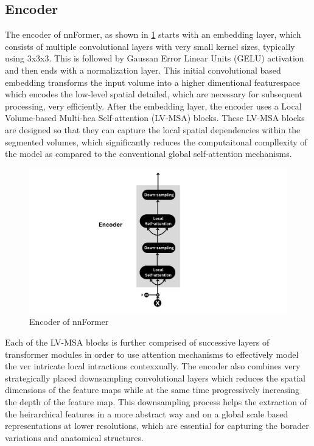 \subsection{Encoder}
The encoder of nnFormer, as shown in \cref{Fig:encoder} starts with an embedding layer, which consists of multiple convolutional layers with very small kernel sizes, typically using 3x3x3. This is followed by Gaussan Error Linear Units (GELU) activation and then ends with a normalization layer. This initial convolutional based embedding transforms the input volume into a higher dimentional featurespace which encodes the low-level spatial detailed, which are necessary for subsequent processing, very efficiently. After the embedding layer, the encoder uses a Local Volume-based Multi-hea Self-attention (LV-MSA) blocks. These LV-MSA blocks are designed so that they can capture the local spatial dependencies within the segmented volumes, which significantly reduces the computaitonal compllexity of the model as compared to the conventional global self-attention mechanisms. 

\begin{figure}[htb!]  %
    \centering
	\centering
	\includegraphics[width=1\textwidth]{images/Encoder.png}
	\caption{\centering Encoder of nnFormer}
	\label{Fig:encoder}
\end{figure}

Each of the LV-MSA blocks is further comprised of successive layers of transformer modules in order to use attention mechanisms to effectively model the ver intricate local intractions contexxually. The encoder also combines very strategically placed downsampling convolutional layers which reduces the spatial dimensions of the feature maps while at the same time progressively increasing the depth of the feature map. This downsampling process helps the extraction of the heirarchical features in a more abstract way and on a global scale based representations at lower resolutions, which are essential for capturing the borader variations and anatomical structures.

